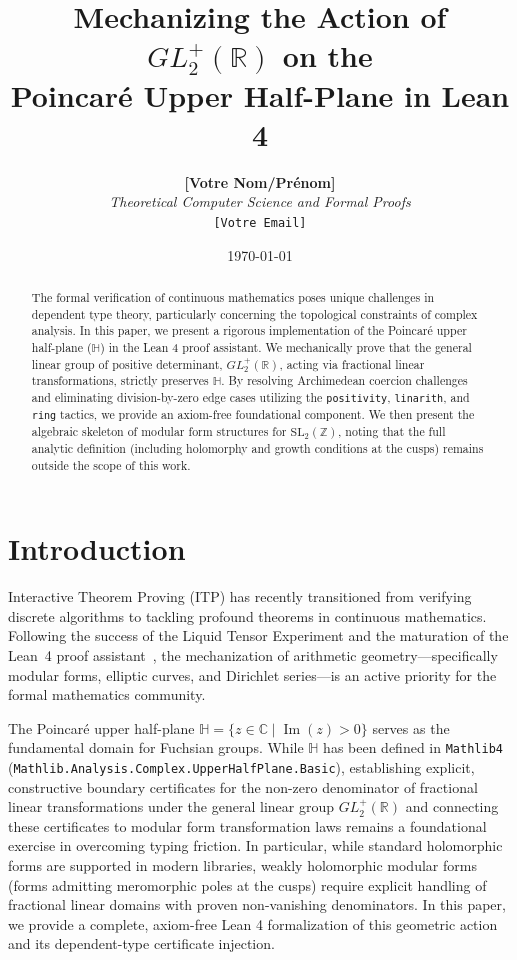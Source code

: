 \documentclass[11pt, a4paper]{article}
\title{\textbf{Mechanizing the Action of $GL_2^+(\mathbb{R})$ on the \\ Poincaré Upper Half-Plane in Lean 4}}
\author{
    \textbf{[Votre Nom/Prénom]} \\
    \textit{Theoretical Computer Science and Formal Proofs} \\
    \texttt{[Votre Email]}
}
\date{\today}
\theoremstyle{remark}
\begin{document}
\maketitle

\begin{abstract}
The formal verification of continuous mathematics poses unique challenges in dependent type theory, particularly concerning the topological constraints of complex analysis. In this paper, we present a rigorous implementation of the Poincaré upper half-plane ($\mathbb{H}$) in the Lean 4 proof assistant. We mechanically prove that the general linear group of positive determinant, $GL_2^+(\mathbb{R})$, acting via fractional linear transformations, strictly preserves $\mathbb{H}$. By resolving Archimedean coercion challenges and eliminating division-by-zero edge cases utilizing the \texttt{positivity}, \texttt{linarith}, and \texttt{ring} tactics, we provide an axiom-free foundational component. We then present the algebraic skeleton of modular form structures for $\mathrm{SL}_2(\mathbb{Z})$, noting that the full analytic definition (including holomorphy and growth conditions at the cusps) remains outside the scope of this work.
\end{abstract}

\section{Introduction}

Interactive Theorem Proving (ITP) has recently transitioned from verifying discrete algorithms to tackling profound theorems in continuous mathematics. Following the success of the Liquid Tensor Experiment \cite{Buzzard2021} and the maturation of the Lean~4 proof assistant~\cite{deMoura2021}, the mechanization of arithmetic geometry---specifically modular forms, elliptic curves, and Dirichlet series---is an active priority for the formal mathematics community.

The Poincaré upper half-plane $\mathbb{H} = \{ z \in \mathbb{C} \mid \operatorname{Im}(z) > 0 \}$ serves as the fundamental domain for Fuchsian groups. While $\mathbb{H}$ has been defined in \texttt{Mathlib4} (\texttt{Mathlib.Analysis.Complex.UpperHalfPlane.Basic}), establishing explicit, constructive boundary certificates for the non-zero denominator of fractional linear transformations under the general linear group $GL_2^+(\mathbb{R})$ and connecting these certificates to modular form transformation laws remains a foundational exercise in overcoming typing friction. In particular, while standard holomorphic forms are supported in modern libraries, weakly holomorphic modular forms (forms admitting meromorphic poles at the cusps) require explicit handling of fractional linear domains with proven non-vanishing denominators. In this paper, we provide a complete, axiom-free Lean 4 formalization of this geometric action and its dependent-type certificate injection.
\end{document}
